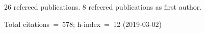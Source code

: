 26 refereed publications. 8 refeered publications as first author.

Total citations~=~578; h-index~=~12 (2019-03-02)